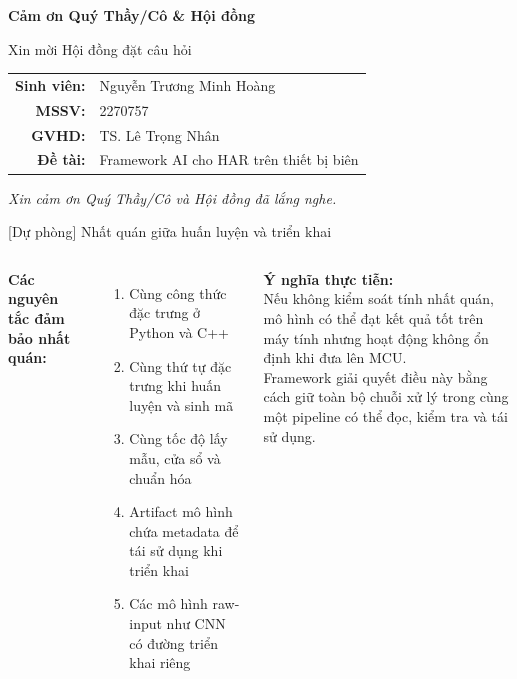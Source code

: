 \documentclass[aspectratio=169,12pt]{beamer}
\begin{document}
\begin{frame}
  \begin{center}
    \vspace{0.5cm}
    {\LARGE\bfseries Cảm ơn Quý Thầy/Cô \& Hội đồng}

    \vspace{0.8cm}
    \large Xin mời Hội đồng đặt câu hỏi

    \vspace{1.2cm}
    \normalsize
    \begin{tabular}{rl}
      \textbf{Sinh viên:} & Nguyễn Trương Minh Hoàng \\
      \textbf{MSSV:}      & 2270757 \\
      \textbf{GVHD:}      & TS. Lê Trọng Nhân \\
      \textbf{Đề tài:}    & Framework AI cho HAR trên thiết bị biên \\
    \end{tabular}

    \vspace{1.0cm}
    \small\textit{Xin cảm ơn Quý Thầy/Cô và Hội đồng đã lắng nghe.}
  \end{center}
\end{frame}

\appendix

\begin{frame}{[Dự phòng] Nhất quán giữa huấn luyện và triển khai}
  \begin{columns}[T]
      \textbf{Các nguyên tắc đảm bảo nhất quán:}
      \begin{enumerate}\scriptsize
        \item Cùng công thức đặc trưng ở Python và C++
        \item Cùng thứ tự đặc trưng khi huấn luyện và sinh mã
        \item Cùng tốc độ lấy mẫu, cửa sổ và chuẩn hóa
        \item Artifact mô hình chứa metadata để tái sử dụng khi triển khai
        \item Các mô hình raw-input như CNN có đường triển khai riêng
      \end{enumerate}

      \textbf{Ý nghĩa thực tiễn:}\\[4pt]
      Nếu không kiểm soát tính nhất quán, mô hình có thể đạt kết quả tốt trên máy tính nhưng hoạt động không ổn định khi đưa lên MCU.\\[6pt]

      Framework giải quyết điều này bằng cách giữ toàn bộ chuỗi xử lý trong cùng một pipeline có thể đọc, kiểm tra và tái sử dụng.
  \end{columns}
\end{frame}
\end{document}

